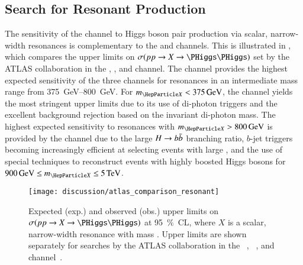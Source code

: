 

\subsection{Search for Resonant \HH Production}

The sensitivity of the \bbtautau channel to Higgs boson pair production via
scalar, narrow-width resonances is complementary to the \bbyy and \bbbb
channels. This is illustrated in , which compares
the upper limits on $\sigma(\pp \to X \to \HH)$ set by the ATLAS collaboration
in the \bbbb, \bbyy, and \bbtautau channel. The \bbtautau channel provides the
highest expected sensitivity of the three channels for resonances in an
intermediate mass range from \SIrange{375}{800}{\GeV}. For
$\mX < \SI{375}{\GeV}$, the \bbyy channel yields the most stringent upper limits
due to its use of di-photon triggers and the excellent background rejection
based on the invariant di-photon mass.
The highest expected sensitivity to resonances with $\mX > \SI{800}{\GeV}$ is
provided by the \bbbb channel due to the large $H \to b\bar{b}$ branching ratio,
$b$-jet triggers becoming increasingly efficient at selecting events with large
\mHH, and the use of special techniques to reconstruct events with highly
boosted Higgs bosons for $\SI{900}{\GeV} \leq \mX \leq \SI{5}{\TeV}$.

\begin{figure}[htbp]
  \centering

  \texttt{[image: discussion/atlas\_comparison\_resonant]}

  \caption[Expected and observed upper limits on $\sigma(\pp \to X \to \HH)$ at
  \SI{95}{\percent}~CL.]{Expected (exp.) and observed (obs.) upper limits on
    $\sigma(\pp \to X \to \HH)$ at \SI{95}{\percent}~CL, where $X$ is a scalar,
    narrow-width resonance with mass \mX. Upper limits are shown separately for
    searches by the ATLAS collaboration in the
    \bbbb~\cite{HDBS-2018-41,hepdata.111124},
    \bbyy~\cite{HDBS-2018-34,hepdata.105864}, and \bbtautau
    channel~\cite{HDBS-2018-40}.}%
  \label{fig:resonant_hh_limits}
\end{figure}

